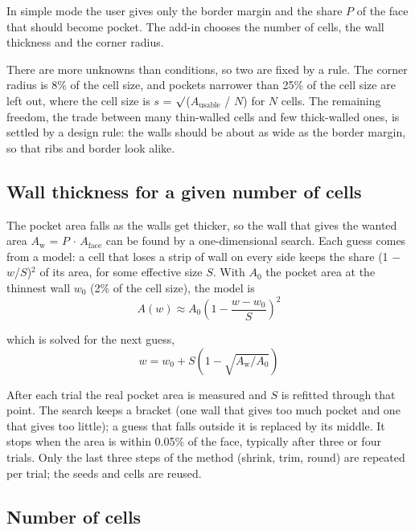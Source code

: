 \documentclass[11pt,a4paper]{article}
\begin{document}
In simple mode the user gives only the border margin and the share $P$ of the face that should become pocket. The add-in chooses the number of cells, the wall thickness and the corner radius. 

There are more unknowns than conditions, so two are fixed by a rule. The corner radius is 8\% of the cell size, and pockets narrower than 25\% of the cell size are left out, where the cell size is $s$ = $\surd $($A_{\mathrm{usable}}$ / $N$) for $N$ cells. The remaining freedom, the trade between many thin-walled cells and few thick-walled ones, is settled by a design rule: the walls should be about as wide as the border margin, so that ribs and border look alike. 

\subsection{Wall thickness for a given number of cells}
 

The pocket area falls as the walls get thicker, so the wall that gives the wanted area $A_{\mathrm{w}}$ = $P$ $\cdot $ $A_{\mathrm{face}}$ can be found by a one-dimensional search. Each guess comes from a model: a cell that loses a strip of wall on every side keeps the share (1 $-$ $w$/$S$)$^2$ of its area, for some effective size $S$. With $A_{0}$ the pocket area at the thinnest wall $w_{0}$ (2\% of the cell size), the model is 
\begin{equation}
A(w) \approx A_0 \left(1 - \frac{w - w_0}{S}\right)^{2}
\end{equation}
 

which is solved for the next guess, 
\begin{equation}
w = w_0 + S\left(1 - \sqrt{A_{\mathrm{w}} / A_0}\right)
\end{equation}
 

After each trial the real pocket area is measured and $S$ is refitted through that point. The search keeps a bracket (one wall that gives too much pocket and one that gives too little); a guess that falls outside it is replaced by its middle. It stops when the area is within 0.05\% of the face, typically after three or four trials. Only the last three steps of the method (shrink, trim, round) are repeated per trial; the seeds and cells are reused. 

\subsection{Number of cells}
 
\end{document}
